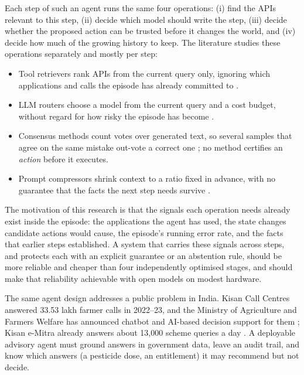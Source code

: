 Each step of such an agent runs the same four operations: (i) find the APIs relevant to this step, (ii)
decide which model should write the step, (iii) decide whether the proposed action can be trusted
before it changes the world, and (iv) decide how much of the growing history to keep. The literature
studies these operations separately and mostly per step:
\begin{itemize}[leftmargin=*]
\item Tool retrievers rank APIs from the current query only, ignoring which applications and calls the
episode has already committed to \citep{qin2024toolllm,zheng2024toolrerank}.
\item LLM routers choose a model from the current query and a cost budget, without regard for how risky
the episode has become \citep{ong2025routellm,panda2025pilot,yue2025masrouter}.
\item Consensus methods count votes over generated text, so several samples that agree on the same
mistake out-vote a correct one \citep{wang2023selfconsistency,du2024debate}; no method certifies an
\emph{action} before it executes.
\item Prompt compressors shrink context to a ratio fixed in advance, with no guarantee that the facts the
next step needs survive \citep{jiang2023llmlingua,li2023selectivecontext}.
\end{itemize}

The motivation of this research is that the signals each operation needs already exist inside the
episode: the applications the agent has used, the state changes candidate actions would cause, the
episode's running error rate, and the facts that earlier steps established. A system that carries
these signals across steps, and protects each with an explicit guarantee or an abstention rule, should
be more reliable and cheaper than four independently optimised stages, and should make that
reliability achievable with open models on modest hardware.

The same agent design addresses a public problem in India. Kisan Call Centres answered 33.53 lakh
farmer calls in 2022--23, and the Ministry of Agriculture and Farmers Welfare has announced chatbot and
AI-based decision support for them \citep{loksabha2023kcc}; Kisan e-Mitra already answers about 13{,}000
scheme queries a day \citep{wadhwani2024kisanemitra}. A deployable advisory agent must ground answers in
government data, leave an audit trail, and know which answers (a pesticide dose, an entitlement) it may
recommend but not decide.

